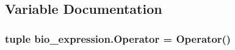 \subsection{Variable Documentation}
\hypertarget{namespacebio__expression_a2bb7e4a0eeeb9b6390b07e42da876720}{
\subsubsection[{Operator}]{\setlength{\rightskip}{0pt plus 5cm}tuple {\bf bio\+\_\+expression.\+Operator} = {\bf Operator}()}}\label{namespacebio__expression_a2bb7e4a0eeeb9b6390b07e42da876720}
